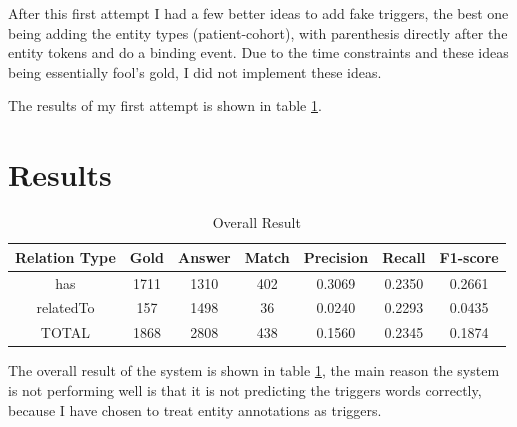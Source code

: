 After this first attempt I had a few better ideas to add fake triggers, the best one being adding the entity types (patient-cohort), with parenthesis directly after the entity tokens and do a binding event. Due to the time constraints and these ideas being essentially fool's gold, I did not implement these ideas. 

The results of my first attempt is shown in table \ref{table:overall_result}.


\section{Results}
\begin{table}
	\caption{Overall Result}
	\centering
	\label{table:overall_result}
	\begin{tabular}{|c | c c |c c c c |}
		\hline 
		{Relation Type} 
		& Gold & Answer  & Match  & Precision & Recall & F1-score\\ 
		\hline
		has  & 1711 & 1310 & 402 & 0.3069 & 0.2350 & 0.2661 \\
		
		relatedTo & 157 & 1498 &  36 & 0.0240 & 0.2293 & 0.0435\\
		\hline 
		TOTAL  & 1868 & 2808 & 438 & 0.1560 & 0.2345 & 0.1874 \\
		\hline 
	\end{tabular}
\end{table}
The overall result of the system is shown in table \ref{table:overall_result}, the main reason the system is not performing well is that it is not predicting the triggers words correctly, because I have chosen to treat entity annotations as triggers.
